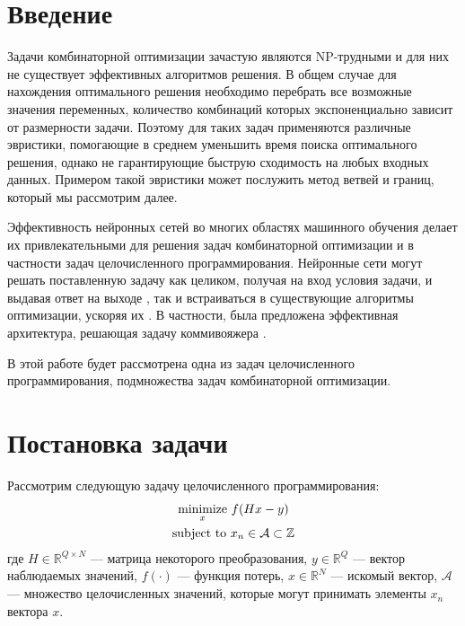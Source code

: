 \documentclass[12pt]{article}
\begin{document}
\newpage
\tableofcontents
\newpage

\section{Введение}

Задачи комбинаторной оптимизации зачастую являются NP-трудными и для них не существует эффективных алгоритмов решения. В общем случае для нахождения оптимального решения необходимо перебрать все возможные значения переменных, количество комбинаций которых экспоненциально зависит от размерности задачи. Поэтому для таких задач применяются различные эвристики, помогающие в среднем уменьшить время поиска оптимального решения, однако не гарантирующие быструю сходимость на любых входных данных. Примером такой эвристики может послужить метод ветвей и границ, который мы рассмотрим далее.

Эффективность нейронных сетей во многих областях машинного обучения делает их привлекательными для решения задач комбинаторной оптимизации и в частности задач целочисленного программирования. Нейронные сети могут решать поставленную задачу как целиком, получая на вход условия задачи, и выдавая ответ на выходе \cite{zhou2020learning, NIPS2015_29921001}, так и встраиваться в существующие алгоритмы оптимизации, ускоряя их \cite{BENGIO2021405, Nair2020SolvingMI}. В частности, была предложена эффективная архитектура, решающая задачу коммивояжера \cite{NIPS2015_29921001}.

В этой работе будет рассмотрена одна из задач целочисленного программирования, подмножества задач комбинаторной оптимизации.

\section{Постановка задачи}

Рассмотрим следующую задачу целочисленного программирования:
$$
\begin{gathered}
    {\operatornamewithlimits{minimize}_x} \ f(Hx - y) \\
    \text{subject to} \ x_n \in \mathcal{A} \subset \mathbb{Z}
\end{gathered}
$$
где $H \in \mathbb{R}^{Q \times N}$ — матрица некоторого преобразования, $y \in \mathbb{R}^Q$ — вектор наблюдаемых значений, $f(\cdot)$ — функция потерь, $x \in \mathbb{R}^N$ — искомый вектор, $\mathcal{A}$ — множество целочисленных значений, которые могут принимать элементы $x_n$ вектора $x$.
\end{document}
